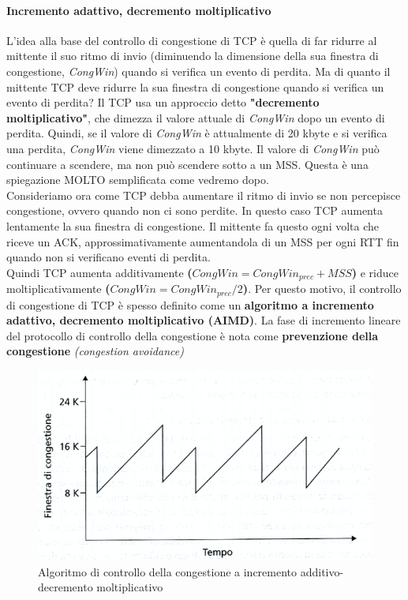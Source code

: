 \documentclass[11pt,a4paper]{article}
\begin{document}
\paragraph{Incremento adattivo, decremento moltiplicativo}
L'idea alla base del controllo di congestione di TCP è quella di far ridurre al mittente il suo ritmo di invio (diminuendo la dimensione della sua finestra di congestione, \emph{CongWin}) quando si verifica un evento di perdita. Ma di quanto il mittente TCP deve ridurre la sua finestra di congestione quando si verifica un evento di perdita? Il TCP usa un approccio detto \textbf{"decremento moltiplicativo"}, che dimezza il valore attuale di \emph{CongWin} dopo un evento di perdita. Quindi, se il valore di \emph{CongWin} è attualmente di 20 kbyte e si verifica una perdita, \emph{CongWin} viene dimezzato a 10 kbyte. Il valore di \emph{CongWin} può continuare a scendere, ma non può scendere sotto a un MSS. Questa è una spiegazione MOLTO semplificata come vedremo dopo. \\
Consideriamo ora come TCP debba aumentare il ritmo di invio se non percepisce congestione, ovvero quando non ci sono perdite. In questo caso TCP aumenta lentamente la sua finestra di congestione. Il mittente fa questo ogni volta che riceve un ACK, approssimativamente aumentandola di un MSS per ogni RTT fin quando non si verificano eventi di perdita. \\
Quindi TCP aumenta additivamente \textbf{($CongWin = CongWin_{prec} + MSS$)} e riduce moltiplicativamente \textbf{($CongWin = CongWin_{prec}/2$)}. Per questo motivo, il controllo di congestione di TCP è spesso definito come un \textbf{algoritmo a incremento adattivo, decremento moltiplicativo (AIMD)}. La fase di incremento lineare del protocollo di controllo della congestione è nota come \textbf{prevenzione della congestione} \textit{(congestion avoidance)}
\begin{figure}
	\includegraphics[scale=0.6]{img/045.png}
	\caption{Algoritmo di controllo della congestione a incremento additivo-decremento moltiplicativo}
\end{figure}
\end{document}
